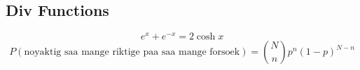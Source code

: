 \documentclass[a4paper,norsk, 10pt]{article}
\begin{document}
\subsection{Div Functions}
\begin{equation}
e^x + e^{-x} = 2\cosh x
\end{equation}
\begin{equation}
P(\text{noyaktig saa mange riktige paa saa mange forsoek}) = \binom{N}{n}p^n(1-p)^{N-n}
\end{equation}
\end{document}
